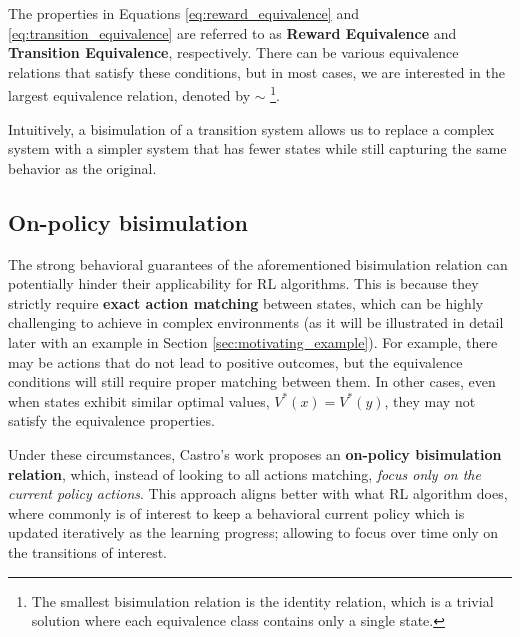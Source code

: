 The properties in Equations \ref{eq:reward_equivalence} and \ref{eq:transition_equivalence} are referred to as \textbf{Reward Equivalence} and \textbf{Transition Equivalence}, respectively. There can be various equivalence relations that satisfy these conditions, but in most cases, we are interested in the largest equivalence relation, denoted by $\sim$ \footnote{The smallest bisimulation relation is the identity relation, which is a trivial solution where each equivalence class contains only a single state.}.

Intuitively, a bisimulation of a transition system allows us to replace a complex system with a simpler system that has fewer states while still capturing the same behavior as the original.

\subsection{On-policy bisimulation}

The strong behavioral guarantees of the aforementioned bisimulation relation can potentially hinder their applicability for RL algorithms. This is because they strictly require \textbf{exact action matching} between states, which can be highly challenging to achieve in complex environments (as it will be illustrated in detail later with an example in Section \ref{sec:motivating_example}). For example, there may be actions that do not lead to positive outcomes, but the equivalence conditions will still require proper matching between them. In other cases, even when states exhibit similar optimal values, $V^*(x) = V^*(y)$, they may not satisfy the equivalence properties.


Under these circumstances, Castro's work \cite{castro2020scalable} proposes an \textbf{on-policy bisimulation relation}, which, instead of looking to all actions matching, \textit{focus only on the current policy actions}. This approach aligns better with what RL algorithm does, where commonly is of interest to keep a behavioral current policy which is updated iteratively as the learning progress; allowing to focus over time only on the transitions of interest. %

